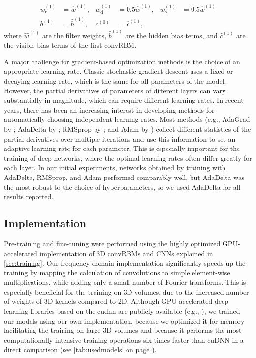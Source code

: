 \begin{align}
w_{\text{c}}^{(1)} &= \hat{w}^{(1)}, &
w_{\text{d}}^{(1)} &= 0.5\hat{w}^{(1)}, &
w_{\text{s}}^{(1)} &= 0.5\hat{w}^{(1)} \\
b^{(1)} &= \hat{b}^{(1)}, &
c^{(0)} &= \hat{c}^{(1)},
\end{align}
where $\hat{w}^{(1)}$ are the filter weights, $\hat{b}^{(1)}$ are the hidden
bias terms, and $\hat{c}^{(1)}$ are the visible bias terms of the first convRBM.

A major challenge for gradient-based optimization methods is the choice of an
appropriate learning rate. Classic stochastic gradient descent \citep{lecun1998}
uses a fixed or decaying learning rate, which is the same for all parameters of
the model. However, the partial derivatives of parameters of different layers
can vary substantially in magnitude, which can require different learning rates.
In recent years, there has been an increasing interest in developing methods for
automatically choosing independent learning rates. Most methods (e.g., AdaGrad
by \citealp{duchi2011}; AdaDelta by \citealp{zeiler2012};
RMSprop by \citealp{dauphin2015}; and Adam by \citealp{kingma2014})
collect different statistics of the partial derivatives over multiple iterations
and use this information to set an adaptive learning rate for each parameter.
This is especially important for the training of deep networks, where the
optimal learning rates often differ greatly for each layer. In our initial
experiments, networks obtained by training with AdaDelta, RMSprop, and Adam
performed comparably well, but AdaDelta was the most robust to the choice of
hyperparameters, so we used AdaDelta for all results reported.

\subsection{Implementation}


Pre-training and fine-tuning were performed using the highly optimized
GPU-accelerated implementation of 3D convRBMs and CNNs explained in
\ref{sec:training}. Our frequency domain implementation significantly speeds up
the training by mapping the calculation of convolutions to simple element-wise
multiplications, while adding only a small number of Fourier transforms. This is
especially beneficial for the training on 3D volumes, due to the increased
number of weights of 3D kernels compared to 2D. Although GPU-accelerated deep
learning libraries based on the \gls{cudnn} \citep{chetlur2014} are publicly
available (e.g., \citealp{jia2014,bastien2012,collobert2011torch7}), we trained
our models using our own implementation, because we optimized it for memory
facilitating the training on large 3D volumes and because it performs the most
computationally intensive training operations six times faster than cuDNN in a
direct comparison (see \ref{tab:usedmodels} on page \pageref{tab:usedmodels}).
 
